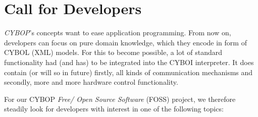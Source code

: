 %
%
%
%
%
%
%

\section{Call for Developers}
\label{call_for_developers_heading}

\emph{CYBOP}'s concepts want to ease application programming. From now on,
developers can focus on pure domain knowledge, which they encode in form of
CYBOL (XML) models. For this to become possible, a lot of standard functionality
had (and has) to be integrated into the CYBOI interpreter. It does contain (or
will so in future) firstly, all kinds of communication mechanisms and secondly,
more and more hardware control functionality.

For our CYBOP \emph{Free/ Open Source Software} (FOSS) project, we therefore
steadily look for developers with interest in one of the following topics:

